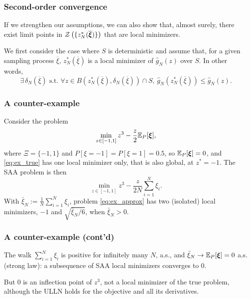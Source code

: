 \documentclass[aspectratio=169]{beamer}
\begin{document}
\begin{frame}
\frametitle{Second-order convergence}

If we strengthen our assumptions, we can also show that, almost surely, there exist limit points in $\mathcal{Z}\left(\lbrace z^*_N(\overline{{\boldsymbol{\xi}}})\rbrace\right)$ that are local minimizers.

\mbox{}

We first consider the case where $S$ is deterministic and assume that, for a given sampling process $\overline{\xi}$, $z_N^*(\overline{\xi})$ is a local minimizer of $\hat{g}_N(z)$ over $S$.
In other words,
\[
\exists\, \delta_N(\overline{\xi}) \text{ s.t. } \forall z \in
B \left( z_N^*(\overline{\xi}), \delta_N(\overline{\xi}) \right) \cap
S,\ \hat{g}_N \left( z_N^*(\overline{\xi}) \right) \leq \hat{g}_N(z).
\]

\end{frame}

\begin{frame}
\frametitle{A counter-example}

Consider the problem
\begin{equation}\label{eq:ex_true}
\min_{z \in [-1, 1]} z^3 - \frac{z}{2}{\mathbb{E}}_P[{\boldsymbol{\xi}}],
\end{equation}
where $\Xi = \lbrace -1, 1\rbrace$ and $P[\xi = -1] = P[\xi = 1] = 0.5$, so ${\mathbb{E}}_P[{\boldsymbol{\xi}}] = 0$, and \eqref{eq:ex_true} has one local minimizer only, that is also global, at $z^* = -1$.
The SAA problem is then
\begin{equation}\label{eq:ex_approx}
\min_{z \in [-1, 1]} z^3 - \frac{z}{2N}\sum_{i = 1}^N \xi_i.
\end{equation}
With $\bar{\xi}_N := \frac{1}{N}\sum_{i = 1}^N \xi_i$, problem \eqref{eq:ex_approx} has two (isolated) local minimizers, $-1$ and $\sqrt{\bar{\xi}_N/6}$, when $\bar{\xi}_N > 0$.

\end{frame}

\begin{frame}
\frametitle{A counter-example (cont'd)}

The walk $\sum_{i=1}^N \xi_i$ is positive for infinitely many $N$, a.s., and $\bar{\xi}_N \rightarrow {\mathbb{E}}_P[{\boldsymbol{\xi}}] = 0$ a.s. (strong law): a subsequence of SAA local minimizers converges to $0$.

\mbox{}

{\red But $0$ is an inflection point of $z^3$, not a local minimizer of the true problem}, although the ULLN holds for the objective and all its derivatives.

\end{frame}
\end{document}

